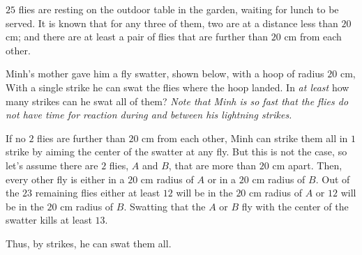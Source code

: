 \documentclass{article}
\begin{document}
\begin{example*}

    $25$ flies are resting on the outdoor table in the garden, waiting for lunch to be served.
    It is known that for any three of them, two are at a distance less than $20$ cm;
    and there are at least a pair of flies that are further than $20$ cm from each other.
    
    Minh's mother gave him a fly swatter, shown below, with a hoop of radius $20$ cm,
    With a single strike he can swat the flies where the hoop landed.
    In \textit{at least} how many strikes can he swat all of them?
    \textit{Note that Minh is so fast that the flies do not have time for reaction during and between his lightning strikes.}
\end{example*}

\begin{soln}
    If no $2$ flies are further than $20$ cm from each other,
    Minh can strike them all in $1$ strike by aiming the center of the swatter at any fly. 
    But this is not the case, so let’s assume there are $2$ flies, $A$ and $B$, that are more than $20$ cm apart.
    Then, every other fly is either in a $20$ cm radius of $A$ or in a $20$ cm radius of $B.$
    Out of the $23$ remaining flies either at least $12$ will be in the $20$ cm radius of $A$
    or $12$ will be in the $20$ cm radius of $B$.
    Swatting that the $A$ or $B$ fly with the center of the swatter kills at least $13$.

    Thus, by  strikes, he can swat them all.
\end{soln}
\end{document}
